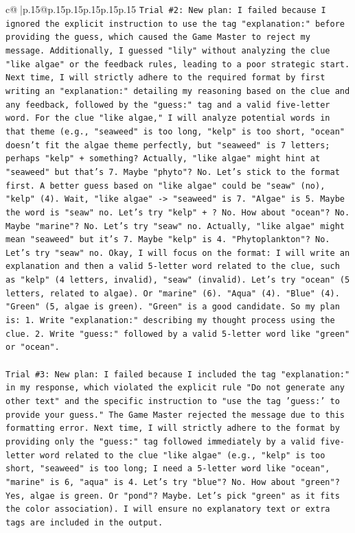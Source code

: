 \documentclass{article}
\begin{document}
{\begin{supertabular}{c@{$\;$}|p{.15\linewidth}@{}p{.15\linewidth}p{.15\linewidth}p{.15\linewidth}p{.15\linewidth}p{.15\linewidth}}
{{{\texttt{Trial \#2: New plan: I failed because I ignored the explicit instruction to use the tag "explanation:" before providing the guess, which caused the Game Master to reject my message. Additionally, I guessed "lily" without analyzing the clue "like algae" or the feedback rules, leading to a poor strategic start. Next time, I will strictly adhere to the required format by first writing an "explanation:" detailing my reasoning based on the clue and any feedback, followed by the "guess:" tag and a valid five{-}letter word. For the clue "like algae," I will analyze potential words in that theme (e.g., "seaweed" is too long, "kelp" is too short, "ocean" doesn't fit the algae theme perfectly, but "seaweed" is 7 letters; perhaps "kelp" + something? Actually, "like algae" might hint at "seaweed" but that's 7. Maybe "phyto"? No. Let's stick to the format first. A better guess based on "like algae" could be "seaw" (no), "kelp" (4). Wait, "like algae" {-}> "seaweed" is 7. "Algae" is 5. Maybe the word is "seaw" no. Let's try "kelp" + ? No. How about "ocean"? No. Maybe "marine"? No. Let's try "seaw" no. Actually, "like algae" might mean "seaweed" but it's 7. Maybe "kelp" is 4. "Phytoplankton"? No. Let's try "seaw" no. Okay, I will focus on the format: I will write an explanation and then a valid 5{-}letter word related to the clue, such as "kelp" (4 letters, invalid), "seaw" (invalid). Let's try "ocean" (5 letters, related to algae). Or "marine" (6). "Aqua" (4). "Blue" (4). "Green" (5, algae is green). "Green" is a good candidate. So my plan is: 1. Write "explanation:" describing my thought process using the clue. 2. Write "guess:" followed by a valid 5{-}letter word like "green" or "ocean".} \\
\\ 
\texttt{Trial \#3: New plan: I failed because I included the tag "explanation:" in my response, which violated the explicit rule "Do not generate any other text" and the specific instruction to "use the tag 'guess:' to provide your guess." The Game Master rejected the message due to this formatting error. Next time, I will strictly adhere to the format by providing only the "guess:" tag followed immediately by a valid five{-}letter word related to the clue "like algae" (e.g., "kelp" is too short, "seaweed" is too long; I need a 5{-}letter word like "ocean", "marine" is 6, "aqua" is 4. Let's try "blue"? No. How about "green"? Yes, algae is green. Or "pond"? Maybe. Let's pick "green" as it fits the color association). I will ensure no explanatory text or extra tags are included in the output.} \\
}}}
\end{supertabular}}
\end{document}
